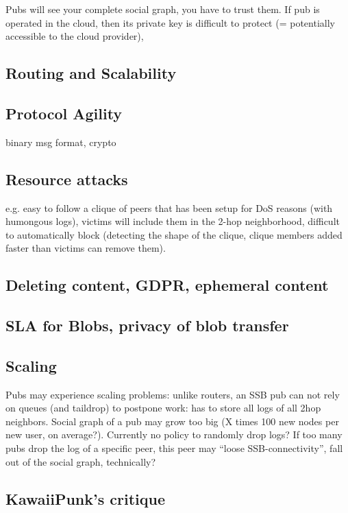 \documentclass[sigconf]{acmart}
\begin{document}
Pubs will see your complete social graph, you have to trust them. If
pub is operated in the cloud, then its private key is difficult to
protect (= potentially accessible to the cloud provider),

\subsection{Routing and Scalability}

\subsection{Protocol Agility}

binary msg format, crypto

\subsection{Resource attacks}
e.g. easy to follow a clique of peers that has been setup for DoS
reasons (with humongous logs), victims will include them in the 2-hop
neighborhood, difficult to automatically block (detecting the shape of
the clique, clique members added faster than victims can remove them).

\subsection{Deleting content, GDPR, ephemeral content}

\subsection{SLA for Blobs, privacy of blob transfer}

\subsection{Scaling}

Pubs may experience scaling problems: unlike routers, an SSB pub can
not rely on queues (and taildrop) to postpone work: has to store all
logs of all 2hop neighbors. Social graph of a pub may grow too big (X
times 100 new nodes per new user, on average?). Currently no policy to
randomly drop logs? If too many pubs drop the log of a specific peer,
this peer may ``loose SSB-connectivity'', fall out of the social
graph, technically?

\subsection{KawaiiPunk's critique}
\end{document}
